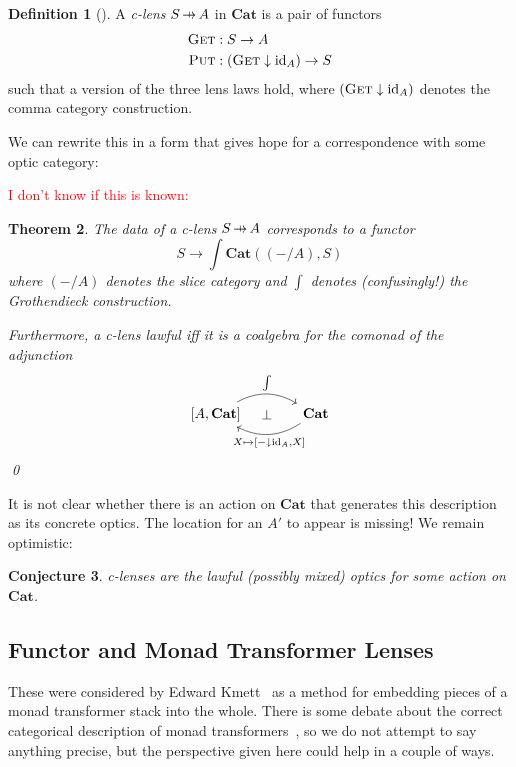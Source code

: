 \documentclass[11pt,letterpaper]{article}
\theoremstyle{plain}
\newtheorem{theorem}{Theorem}[subsection]
\newtheorem{conjecture}[theorem]{Conjecture}
\theoremstyle{definition}
\newtheorem{definition}[theorem]{Definition}
\newcommand{\Cat}{\mathbf{Cat}}
\newcommand{\id}{\mathrm{id}}
\newcommand{\fget}{\textsc{Get}}
\newcommand{\fput}{\textsc{Put}}
\newcommand{\hto}{\ensuremath{\,\mathaccent\shortmid\rightarrow\,}}
\newcommand{\todo}[1]{\textcolor{red}{\small #1}}
\begin{document}
\begin{definition}[{\cite[Definition 4.1]{LensesFibrationsAndUniversalTranslations}}]
A \emph{c-lens} $S \hto A$ in $\Cat$ is a pair of functors
\begin{align*}
\fget &: S \to A \\
\fput &: (\fget \downarrow \id_{A}) \to S
\end{align*}
such that a version of the three lens laws hold, where $(\fget \downarrow \id_{A})$ denotes the comma category construction.
\end{definition}

We can rewrite this in a form that gives hope for a correspondence with some optic category:

\todo{I don't know if this is known:}
\begin{theorem}
The data of a c-lens $S \hto A$ corresponds to a functor \[ S \to \int \Cat ((- / A), S) \] where $(-/A)$ denotes the slice category and $\int$ denotes (confusingly!) the Grothendieck construction.

Furthermore, a c-lens lawful iff it is a coalgebra for the comonad of the adjunction
\[
\begin{tikzcd}[column sep = large]
{[A, \Cat]} \ar[r, bend left, "\int"] \ar[r, phantom, "\bot" pos = 0.4] & \Cat \ar[l, bend left, "{X \mapsto [- \downarrow \id_A, X]}" below]
\end{tikzcd}
\]
\qed
\end{theorem}

It is not clear whether there is an action on $\Cat$ that generates this description as its concrete optics. The location for an $A'$ to appear is missing! We remain optimistic:

\begin{conjecture}
c-lenses are the lawful (possibly mixed) optics for some action on $\Cat$.
\end{conjecture}

\subsection{Functor and Monad Transformer Lenses}
These were considered by Edward Kmett~\cite{MonadTransformerLensesTalk}  as a method for embedding pieces of a monad transformer stack into the whole. There is some debate about the correct categorical description of monad transformers~\cite{MonadTransformersAsMonoidTransformers, CalculatingMonadTransformersCategoryTheory}, so we do not attempt to say anything precise, but the perspective given here could help in a couple of ways.
\end{document}
